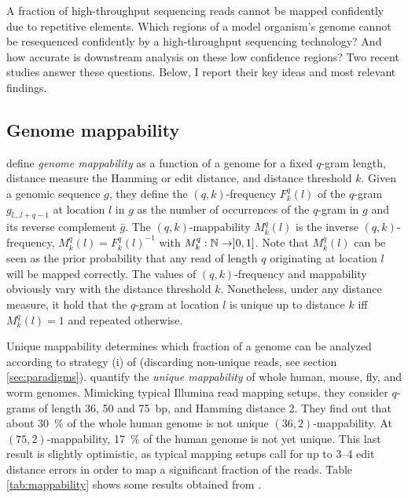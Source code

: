 A fraction of high-throughput sequencing reads cannot be mapped confidently due to repetitive elements.
Which regions of a model organism's genome cannot be resequenced confidently by a high-throughput sequencing technology?
And how accurate is downstream analysis on these low confidence regions?
Two recent studies \citep{Derrien2012, Lee2012} answer these questions.
Below, I report their key ideas and most relevant findings.

\subsection{Genome mappability}

\citeauthor{Derrien2012} define \emph{genome mappability} as a function of a genome for a fixed $q$-gram length, distance measure \ie the Hamming or edit distance, and distance threshold $k$.
Given a genomic sequence $g$, they define the $(q,k)$-frequency $F^q_k(l)$ of the $q$-gram $g_{l \dots l+q-1}$ at location $l$ in $g$ as the number of occurrences of the $q$-gram in $g$ and its reverse complement $\bar{g}$.
The $(q,k)$-mappability $M^q_k(l)$ is the inverse $(q,k)$-frequency, \ie $M^q_k(l) = {F^q_k(l)}^{-1}$ with $M^q_k : \mathbb {N} \rightarrow ]0,1]$.
Note that $M^q_k(l)$ can be seen as the prior probability that any read of length $q$ originating at location $l$ will be mapped correctly.
The values of $(q,k)$-frequency and mappability obviously vary with the distance threshold $k$. Nonetheless, under any distance measure, it hold that the $q$-gram at location $l$ is unique up to distance $k$ iff $M^q_k(l) = 1$ and repeated otherwise.

Unique mappability determines which fraction of a genome can be analyzed according to strategy (i) of \citep{Treangen2011} (\ie discarding non-unique reads, see section \ref{sec:paradigms}).
\citeauthor{Derrien2012} quantify the \emph{unique mappability} of whole human, mouse, fly, and worm genomes.
Mimicking typical Illumina read mapping setups, they consider $q$-grams of length 36, 50 and 75~bp, and Hamming distance 2.
They find out that about 30~\% of the whole human genome is not unique \wrt $(36,2)$-mappability.
At $(75,2)$-mappability, 17~\% of the human genome is not yet unique.
This last result is slightly optimistic, as typical mapping setups call for up to 3--4 edit distance errors in order to map a significant fraction of the reads.
Table \ref{tab:mappability} shows some results obtained from \citep{Derrien2012}.


